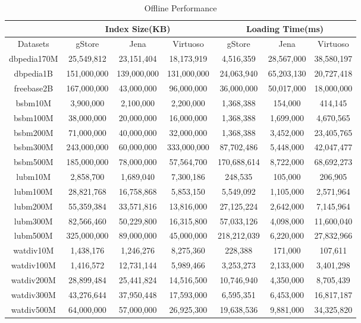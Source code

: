 \documentclass[titlepage, a4paper, 12pt] {article}
\begin{document}
\begin{table}[htp]
	\small
	\begin{threeparttable}
		\begin{tabular}{|c||c|c|c||c|c|c|}
			\hline
			& \multicolumn{3}{c||}{Index Size(KB)}& \multicolumn{3}{c|}{Loading Time(ms)}\\
			\hline
			\hline
			Datasets & gStore & Jena & Virtuoso & gStore & Jena & Virtuoso \\
			\hline
			dbpedia170M & 25,549,812 &	23,151,404	& 18,173,919 & 4,516,359	& 28,567,000 & 38,580,197	\\
			\hline
			dbpedia1B & 151,000,000 &	139,000,000	& 131,000,000 & 24,063,940	& 65,203,130 & 20,727,418	\\
			\hline
			freebase2B & 167,000,000 &	43,000,000	& 96,000,000 & 36,000,000	& 50,017,000 & 18,000,000	\\
			\hline
			bsbm10M & 3,900,000 &	2,100,000	& 2,200,000 & 1,368,388	& 154,000 & 414,145	\\
			\hline
			bsbm100M & 38,000,000 &	20,000,000	& 16,000,000 & 1,368,388	& 1,699,000 & 4,670,565	\\
			\hline
			bsbm200M & 71,000,000 &	40,000,000	& 32,000,000 & 1,368,388	& 3,452,000 & 23,405,765	\\
			\hline
			bsbm300M & 243,000,000 & 60,000,000	& 333,000,000 & 87,702,486	& 5,448,000 & 42,047,477	\\
			\hline
			bsbm500M & 185,000,000 &	78,000,000	& 57,564,700 & 170,688,614	& 8,722,000 & 68,692,273	\\
			\hline
			lubm10M  &2,858,700 &1,689,040 & 7,300,186 &	248,535 &	105,000 & 206,905	 \\
			\hline
			lubm100M & 28,821,768 &	16,758,868 & 5,853,150 & 5,549,092	& 1,105,000 & 2,571,964  \\
			\hline
			lubm200M & 55,359,384 &	33,571,816 & 13,816,000 & 27,125,224	& 2,642,000 & 7,145,964  \\
			\hline
			lubm300M & 82,566,460 &	50,229,800 & 16,315,800 & 57,033,126	& 4,098,000 & 11,600,040  \\
			\hline
			lubm500M & 325,000,000 & 89,000,000 & 45,000,000 & 218,212,039	& 6,220,000 & 27,832,966  \\
			\hline
			watdiv10M & 1,438,176 &	1,246,276 & 8,275,360 & 228,388	& 171,000 & 107,611  \\
			\hline
			watdiv100M & 1,416,572 & 12,731,144	 & 5,989,466 & 3,253,273 & 2,133,000 & 3,401,298	\\
			\hline
			watdiv200M & 28,899,484 &	25,441,824 & 14,516,500 & 10,746,940	& 4,350,000	& 8,705,439 \\
			\hline
			watdiv300M & 43,276,644 &	37,950,448	 & 17,593,000 & 6,595,351	& 6,453,000 & 16,817,187 \\
			\hline
			watdiv500M & 64,000,000 &	57,000,000	 & 26,925,300 & 19,638,536	& 9,881,000 & 34,325,820 \\
			\hline
		\end{tabular}
	\end{threeparttable}
	\caption{Offline Performance}
	\label{table:loading}
\end{table}
\end{document}
